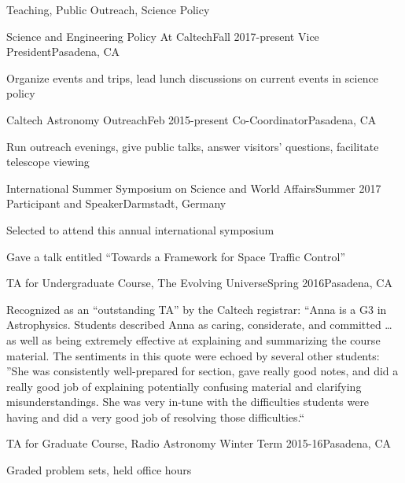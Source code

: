 \documentclass{resume} %
\begin{document}
\begin{rSection}{Teaching, Public Outreach, Science Policy}

  \begin{rSubsection}{Science and Engineering Policy At Caltech}{Fall 2017-present}
    {Vice President}{Pasadena, CA}
  \item Organize events and trips,
    lead lunch discussions on current events in science policy
  \end{rSubsection}

  \begin{rSubsection}{Caltech Astronomy Outreach}{Feb 2015-present}
    {Co-Coordinator}{Pasadena, CA}
  \item Run outreach evenings, give public talks, answer visitors' questions, 
    facilitate telescope viewing
  \end{rSubsection}

  \begin{rSubsection}{International Summer Symposium on Science and World Affairs}{Summer 2017}
      {Participant and Speaker}{Darmstadt, Germany}
    \item Selected to attend this annual international symposium
    \item Gave a talk entitled ``Towards a Framework for Space Traffic Control''
  \end{rSubsection}

  \begin{rSubsection}
    {TA for Undergraduate Course, The Evolving Universe}{Spring 2016}{}{Pasadena, CA}
  \item Recognized as an ``outstanding TA'' by the Caltech registrar:
    ``Anna is a G3 in Astrophysics. 
    Students described Anna as caring, considerate, and committed \ldots 
    as well as being extremely effective at explaining and summarizing the 
    course material. The sentiments in this quote were echoed by several other 
    students: ''She was consistently well-prepared for section, 
    gave really good notes, and did a really good job of explaining 
    potentially confusing material and clarifying misunderstandings. 
    She was very in-tune with the difficulties students were having 
    and did a very good job of resolving those difficulties.``
  \end{rSubsection}


  \begin{rSubsection}{TA for Graduate Course, Radio Astronomy}
    {Winter Term 2015-16}{}{Pasadena, CA}
  \item Graded problem sets, held office hours
  \end{rSubsection}


\end{rSection}
\end{document}
